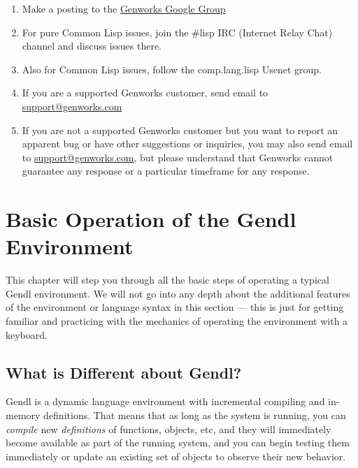 \documentclass [11pt]{book}
\begin{document}
\begin{enumerate}

\item Make a posting to the \href{http://groups.google.com/group/genworks}{Genworks Google Group}

\item For pure Common Lisp issues, join the \#lisp IRC (Internet Relay Chat) channel and discuss issues there.

\item Also for Common Lisp issues, follow the comp.lang.lisp Usenet group.

\item If you are a supported Genworks customer, send email to \href{mailto:support@genworks.com}{support@genworks.com}

\item If you are not a supported Genworks customer but you want to report an apparent bug or have other suggestions or inquiries, you may also send email to \href{mailto:support@genworks.com}{support@genworks.com}, but please understand that Genworks cannot guarantee any response or a particular timeframe for any response.

\end{enumerate}



\chapter{Basic Operation of the Gendl Environment}

\label{chap:basicoperationofthegendlenvironment}

This chapter will step you through all the basic steps of
operating a typical Gendl environment. We will not go into any depth
about the additional features of the environment or language syntax in
this section --- this is just for getting familiar and practicing with
the mechanics of operating the environment with a keyboard.

\section{What is Different about Gendl?}

\label{sec:whatisdifferentaboutgendl?}

Gendl is  a dynamic language environment with incremental compiling and in-memory 
definitions. That means that as long as the system is running, you can \emph{compile} new \emph{definitions} of functions, objects, etc, and they will immediately become available as part of the running system,
and you can begin testing them immediately or update an existing set of objects to observe their new behavior.
\end{document}
